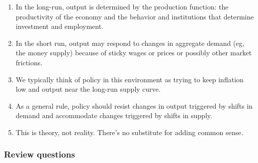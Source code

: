 \documentclass[letterpaper,12pt]{article}
\begin{document}
\begin{enumerate}

\item In the long-run, output is determined by the production function:
the productivity of the economy and the behavior and institutions
that determine investment and employment.  

\item In the short run, output may respond to changes in  
aggregate demand (eg, the money supply) because of sticky wages or prices 
or possibly other market frictions.  

\item We typically think of policy in this environment as 
trying to keep inflation low and output near the long-run 
supply curve. 

\item As a general rule, policy should resist changes in output
triggered by shifts in demand and accommodate
changes triggered by shifts in supply.  

\item This is theory, not reality.  
There's no substitute for adding common sense.  

\end{enumerate}


\subsubsection*{Review questions}
\end{document}

